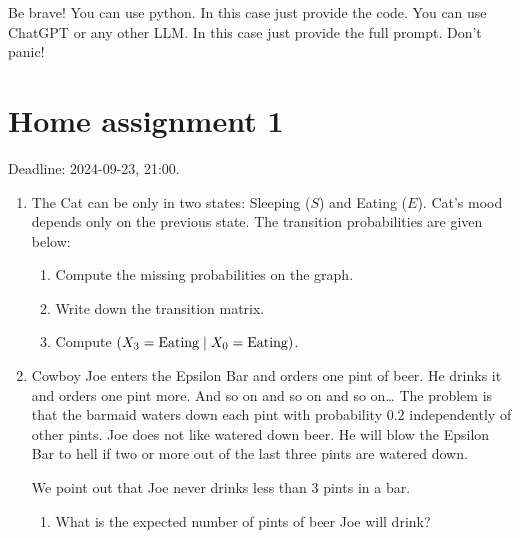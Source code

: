 \documentclass[12pt]{article}
\let\P\relax
\DeclareMathOperator{\P}{\mathbb{P}}
\begin{document}
Be brave! You can use python. In this case just provide the code. 
You can use ChatGPT or any other LLM. In this case just provide the full prompt. 
Don't panic!


\section*{Home assignment 1}


Deadline: 2024-09-23, 21:00.

\begin{enumerate}
\item The Cat can be only in two states: Sleeping ($S$) and Eating ($E$). 
Cat's mood depends only on the previous state. 
The transition probabilities are given below:



\begin{enumerate}
    \item Compute the missing probabilities on the graph.
    \item Write down the transition matrix.
    \item Compute $\P(X_3 = \text{Eating} \mid X_0 = \text{Eating})$.
\end{enumerate}

\item Cowboy Joe enters the Epsilon Bar and orders one pint of beer. 
He drinks it and orders one pint more. 
And so on and so on and so on\dots{ }
The problem is that the barmaid waters down each pint with probability $0.2$ independently of other pints.
Joe does not like watered down beer. 
He will blow the Epsilon Bar to hell if two or more out of the last three pints are watered down. 

We point out that Joe never drinks less than 3 pints in a bar. 

\begin{enumerate}
    \item What is the expected number of pints of beer Joe will drink?
\end{enumerate}


\end{enumerate}
\end{document}
